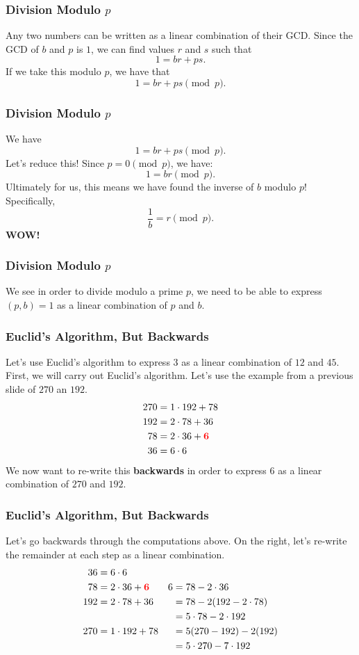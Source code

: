 \documentclass{beamer}
\newcommand{\<}{\langle}
\renewcommand{\>}{\rangle}
\begin{document}
\begin{frame}
\frametitle{Division Modulo $p$}

Any two numbers can be written as a linear combination of their GCD. Since the GCD of $b$ and $p$ is $1$, we can find values $r$ and $s$ such that
\[
1 = br + ps.
\]
If we take this modulo $p$, we have that
\[
1 = br + ps \pmod p.
\]
\end{frame}

\begin{frame}
\frametitle{Division Modulo $p$}

We have
\[
1 = br + ps \pmod p.
\]
Let's reduce this! Since $p = 0 \pmod p$, we have:
\[
1 = br \pmod p.
\]
Ultimately for us, this means we have found the inverse of $b$ modulo $p$! Specifically, 
\[
\frac{1}{b} = r \pmod p.
\]
\textbf{WOW!}
\end{frame}


\begin{frame}
\frametitle{Division Modulo $p$}

We see in order to divide modulo a prime $p$, we need to be able to express $(p,b) = 1$ as a linear combination of $p$ and $b$.
\end{frame}


\begin{frame}
\frametitle{Euclid's Algorithm, But Backwards}

Let's use Euclid's algorithm to express $3$ as a linear combination of $12$ and $45$. First, we will carry out Euclid's algorithm. Let's use the example from a previous slide of $270$ an $192$.
\begin{align*}
270 &= 1\cdot 192 + 78\\
192 &= 2\cdot 78 + 36\\
78 &= 2\cdot 36 + {\color{red}\mathbf{6}}\\
36 &= 6\cdot 6
\end{align*}
We now want to re-write this \textbf{backwards} in order to express $6$ as a linear combination of $270$ and $192$.
\end{frame}

\begin{frame}
\frametitle{Euclid's Algorithm, But Backwards}
Let's go backwards through the computations above. On the right, let's re-write the remainder at each step as a linear combination.
\begin{align*}36 &= 6\cdot 6 & & \\
78 &= 2\cdot 36 + {\color{red}\mathbf{6}}&  6 &= 78 - 2\cdot 36 \\
192 &= 2\cdot 78 + 36 &  &= 78 - 2(192 - 2\cdot 78)\\
 & & &= 5\cdot 78 - 2 \cdot 192 \\
270 &= 1\cdot 192 + 78 &  &= 5(270 - 192) -2(192) \\
&  & & = 5\cdot 270 - 7\cdot 192
\end{align*}
\end{frame}
\end{document}
